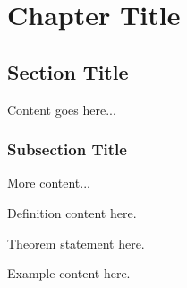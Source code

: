 
\chapter{Chapter Title}

\section{Section Title}

Content goes here...

\subsection{Subsection Title}

More content...

\begin{definition}
Definition content here.
\end{definition}

\begin{theorem}
Theorem statement here.
\end{theorem}

\begin{example}
Example content here.
\end{example}
